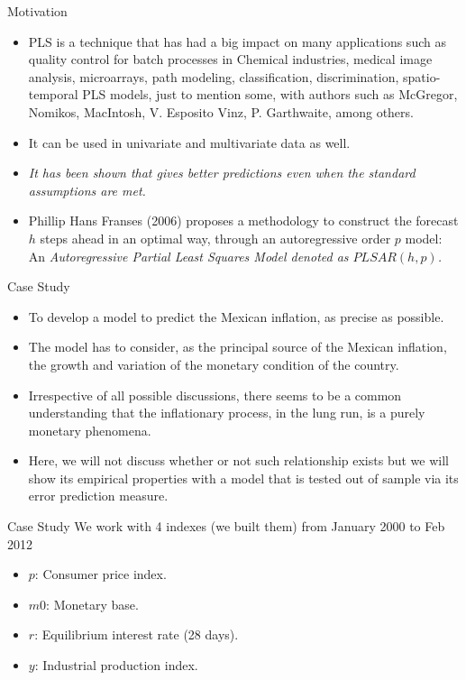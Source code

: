 \documentclass{beamer}
\newcommand{\?}{?`}
\begin{document}
\begin{frame}{Motivation}
  \begin{itemize}
    \item PLS is a technique that has had a big impact on many applications such as quality control for
    batch processes in Chemical industries, medical image analysis, microarrays, path modeling,
    classification, discrimination, spatio-temporal PLS models, just to mention some, with authors such as
    McGregor, Nomikos, MacIntosh, V. Esposito Vinz, P. Garthwaite, among others.
    \item It can be used in univariate and multivariate data as well.
    \item {\it{It has been shown that gives better predictions even when the standard assumptions are met.}}
    \item Phillip Hans Franses (2006) proposes a methodology to construct the forecast $h$ steps ahead in an
    optimal way, through an autoregressive order $p$ model:  An \it{Autoregressive Partial Least Squares Model} denoted as  $PLSAR(h,p)$.
      \end{itemize}
    \end{frame}

\begin{frame}{Case Study}
  \begin{itemize}
    \item To develop a model to predict the Mexican inflation, as precise as possible.
    \item The model has to consider, as the principal source of the Mexican inflation,
    the growth and variation of the monetary condition of the country.
    \item Irrespective of all possible discussions, there seems to be a common understanding
     that the inflationary process, in the lung run, is a purely monetary phenomena.
    \item Here, we will not discuss whether or not such relationship exists
    but we will show its empirical properties with a model that is tested out of sample via its error prediction measure.

  \end{itemize}
\end{frame}

\begin{frame}{Case Study}
  We work with 4 indexes (we built them) from January 2000 to Feb 2012
  \bigskip

  \begin{itemize}
    \item $p$: Consumer price index.
    \bigskip
    \item $m0$: Monetary base.
      \bigskip
    \item $r$: Equilibrium interest rate (28 days).
      \bigskip
    \item $y$: Industrial production index.
  \end{itemize}
\end{frame}
\end{document}
